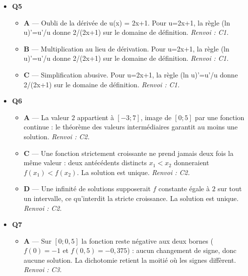 \begin{itemize}
\begin{itemize}
    \item \textbf{A} — Inverse x/e\textasciicircum{}x tend vers 0. L'exponentielle domine x à l'infini, donc exp(x)/x tend vers +infini. \emph{Renvoi : C1.}
    \item \textbf{B} — Forme indeterminee non levee. L'exponentielle domine x à l'infini, donc exp(x)/x tend vers +infini. \emph{Renvoi : C1.}
    \item \textbf{D} — Valeur en x=1. L'exponentielle domine x à l'infini, donc exp(x)/x tend vers +infini. \emph{Renvoi : C1.}
  \end{itemize}
  \item \textbf{Q5}
  \begin{itemize}
    \item \textbf{A} — Oubli de la dérivée de u(x) = 2x+1. Pour u=2x+1, la règle (ln u)'=u'/u donne 2/(2x+1) sur le domaine de définition. \emph{Renvoi : C1.}
    \item \textbf{B} — Multiplication au lieu de dérivation. Pour u=2x+1, la règle (ln u)'=u'/u donne 2/(2x+1) sur le domaine de définition. \emph{Renvoi : C1.}
    \item \textbf{C} — Simplification abusive. Pour u=2x+1, la règle (ln u)'=u'/u donne 2/(2x+1) sur le domaine de définition. \emph{Renvoi : C1.}
  \end{itemize}
  \item \textbf{Q6}
  \begin{itemize}
    \item \textbf{A} — La valeur $2$ appartient à $[-3;7]$, image de $[0;5]$ par une fonction continue : le théorème des valeurs intermédiaires garantit au moins une solution. \emph{Renvoi : C2.}
    \item \textbf{C} — Une fonction strictement croissante ne prend jamais deux fois la même valeur : deux antécédents distincts $x_1<x_2$ donneraient $f(x_1)<f(x_2)$. La solution est unique. \emph{Renvoi : C2.}
    \item \textbf{D} — Une infinité de solutions supposerait $f$ constante égale à $2$ sur tout un intervalle, ce qu'interdit la stricte croissance. La solution est unique. \emph{Renvoi : C2.}
  \end{itemize}
  \item \textbf{Q7}
  \begin{itemize}
    \item \textbf{A} — Sur $[0;0{,}5]$ la fonction reste négative aux deux bornes ($f(0)=-1$ et $f(0{,}5)=-0{,}375$) : aucun changement de signe, donc aucune solution. La dichotomie retient la moitié où les signes diffèrent. \emph{Renvoi : C3.}

\end{itemize}
\end{itemize}
